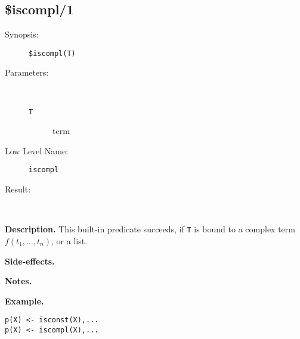 %
%
%
\subsection{\$iscompl/1}

\begin{description}
\item[Synopsis:]
	{\tt \$iscompl(T)}
\item[Parameters:]\ \\[-0.5cm]
	\begin{description}
	\item[{\tt T}] term
	\end{description}
\item[Low Level Name:]
	{\tt iscompl}
\item[Result:]\ \\
\end{description}

\vspace*{0.5cm}
\noindent
{\bf Description.}
This built-in predicate succeeds, if {\tt T} is
bound to a complex term $f(t_1,\ldots,t_n)$, or a list.


\vspace*{0.5cm}
\noindent
{\bf Side-effects.}

\vspace*{0.5cm}
\noindent
{\bf Notes.}

\vspace*{0.5cm}
\noindent
{\bf Example.}
\begin{verbatim}
p(X) <- isconst(X),...
p(X) <- iscompl(X),...
\end{verbatim}


